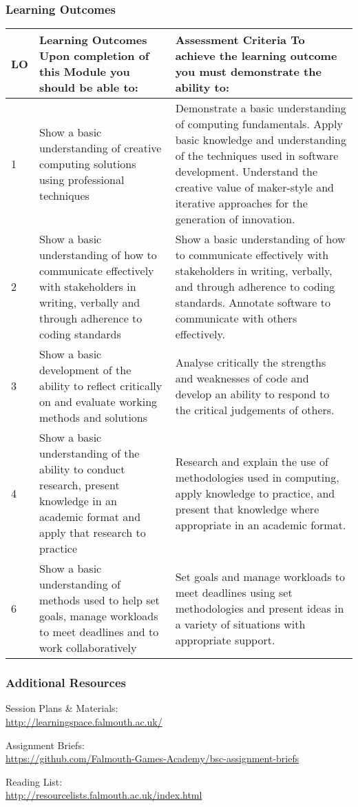 \documentclass[handout, xcolor={dvipsnames}]{beamer}\usepackage{etoolbox}\newtoggle{printable}\toggletrue{printable}
\begin{document}
\begin{frame}
\frametitle{Learning Outcomes}

\centering
\tiny
\begin{tabular} { | p{} | p{} | p{} |}
	LO &
	\textbf{Learning Outcomes} Upon completion of this Module you should be able to: &  
	\textbf{Assessment Criteria} To achieve the learning outcome you must demonstrate the ability to: \\
	\hline
	1 &
	Show a basic understanding of creative computing solutions using professional techniques  &  
	Demonstrate a basic understanding of computing fundamentals. Apply basic knowledge and understanding of the techniques used in software development. Understand the creative value of maker-style and iterative approaches for the generation of innovation. \\
	2 &
	Show a basic understanding of how to communicate effectively with stakeholders in writing, verbally and through adherence to coding standards &  
	Show a basic understanding of how to communicate effectively with stakeholders in writing, verbally, and through adherence to coding standards. Annotate software to communicate with others effectively. \\
	3 &
	Show a basic development of the ability to reflect critically on and evaluate working methods and solutions  & 
	Analyse critically the strengths and weaknesses of code and develop an ability to respond to the critical judgements of others. \\
	4 &
	Show a basic understanding of the ability to conduct research, present knowledge in an academic format and apply that research to practice  & 
	Research and explain the use of methodologies used in computing, apply knowledge to practice, and present that knowledge where appropriate in an academic format. \\
	6 &
	Show a basic understanding of methods used to help set goals, manage workloads to meet deadlines and to work collaboratively  & 
	Set goals and manage workloads to meet deadlines using set methodologies and present ideas in a variety of situations with appropriate support. 
\end{tabular}


\end{frame}

\begin{frame}
\frametitle{Additional Resources}

Session Plans \& Materials: \\
\url{http://learningspace.falmouth.ac.uk/}

\vspace{1.5em}	

Assignment Briefs: \\
\url{https://github.com/Falmouth-Games-Academy/bsc-assignment-briefs}

\vspace{1.5em}	

Reading List: \\
\url{http://resourcelists.falmouth.ac.uk/index.html}

\end{frame}
\end{document}
